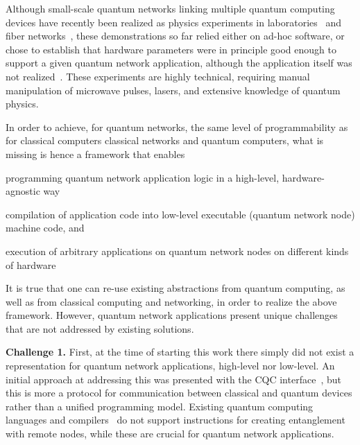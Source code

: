 Although small-scale quantum networks linking multiple quantum computing devices have recently been realized as physics experiments in laboratories~\cite{moehring_2007_ion_traps,ritter_2012_elementary,hofmann_2012_heralded,stockill_2017_phasetuned,jing2019entanglement,stephenson_2020_highrate,pompili_2021_multinode,krutyanskiy_entanglement_2023} and fiber networks~\cite{liu2024creation,stolk2024metropolitan,knaut2024entanglement}, these demonstrations so far relied either on ad-hoc software, or chose to establish that hardware parameters were in principle good enough to support a given quantum network application, although the application itself was not realized~\cite{nadlinger_device-independent_2022,liu_2022_photonic_diqkd,zhang_2022_diqkd}.
These experiments are highly technical, requiring manual manipulation of microwave pulses, lasers, and extensive knowledge of quantum physics.

In order to achieve, for quantum networks, the same level of programmability as for classical computers classical networks and quantum computers, what is missing is hence a framework that enables
\begin{inlinelist}
\item programming quantum network application logic in a high-level, hardware-agnostic way
\item compilation of application code into low-level executable (quantum network node) machine code, and
\item execution of arbitrary applications on quantum network nodes on different kinds of hardware
\end{inlinelist}

It is true that one can re-use existing abstractions from quantum computing, as well as from classical computing and networking, in order to realize the above framework.
However, quantum network applications present unique challenges that are not addressed by existing solutions.




\textbf{Challenge 1.} First, at the time of starting this work there simply did not exist a representation for quantum network applications, high-level nor low-level.
An initial approach at addressing this was presented with the CQC interface~\cite{dahlberg2018simulaqron}, but this is more a protocol for communication between classical and quantum devices rather than a unified programming model.
Existing quantum computing languages and compilers~\cite{heim_quantum_2020, larose_overview_2019} do not support instructions for creating entanglement with remote nodes, while these are crucial for quantum network applications.

